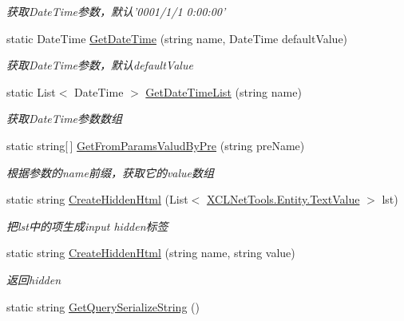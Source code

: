 \begin{DoxyCompactItemize}
\begin{DoxyCompactList}\small\item\em 获取\-Date\-Time参数，默认'0001/1/1 0\-:00\-:00' \end{DoxyCompactList}\item 
static Date\-Time \hyperlink{class_x_c_l_net_tools_1_1_string_hander_1_1_form_helper_adf1ee0dea579cc0333567e9523070ce4}{Get\-Date\-Time} (string name, Date\-Time default\-Value)
\begin{DoxyCompactList}\small\item\em 获取\-Date\-Time参数，默认default\-Value \end{DoxyCompactList}\item 
static List$<$ Date\-Time $>$ \hyperlink{class_x_c_l_net_tools_1_1_string_hander_1_1_form_helper_a5f45de423709334dacacc84764ac9079}{Get\-Date\-Time\-List} (string name)
\begin{DoxyCompactList}\small\item\em 获取\-Date\-Time参数数组 \end{DoxyCompactList}\item 
static string\mbox{[}$\,$\mbox{]} \hyperlink{class_x_c_l_net_tools_1_1_string_hander_1_1_form_helper_a5b0bd096fa3caa418a65570579394201}{Get\-From\-Params\-Valud\-By\-Pre} (string pre\-Name)
\begin{DoxyCompactList}\small\item\em 根据参数的name前缀，获取它的value数组 \end{DoxyCompactList}\item 
static string \hyperlink{class_x_c_l_net_tools_1_1_string_hander_1_1_form_helper_ae6425dda60cd7288371433985e8edb00}{Create\-Hidden\-Html} (List$<$ \hyperlink{class_x_c_l_net_tools_1_1_entity_1_1_text_value}{X\-C\-L\-Net\-Tools.\-Entity.\-Text\-Value} $>$ lst)
\begin{DoxyCompactList}\small\item\em 把lst中的项生成input hidden标签 \end{DoxyCompactList}\item 
static string \hyperlink{class_x_c_l_net_tools_1_1_string_hander_1_1_form_helper_a3df398dd109cfe76da34602149d16410}{Create\-Hidden\-Html} (string name, string value)
\begin{DoxyCompactList}\small\item\em 返回hidden \end{DoxyCompactList}\item 
static string \hyperlink{class_x_c_l_net_tools_1_1_string_hander_1_1_form_helper_ab3d6c0e951ba151fe5efc423854bbff4}{Get\-Query\-Serialize\-String} ()

\end{DoxyCompactItemize}
